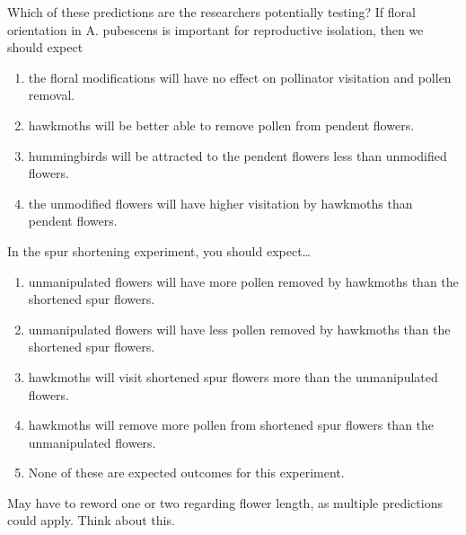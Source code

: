 \documentclass[t,hidelinks]{beamer}
\newcommand{\ques}[1]{\highlight{\textsc{q#1:}}}
\begin{document}
%
\begin{frame}[t]{\ques9 Which of these predictions are the researchers potentially testing?}
	If floral orientation in A. pubescens is important for reproductive isolation, then we should expect
	
	\begin{enumerate}
		\item the floral modifications will have no effect on pollinator visitation and pollen removal.
		\item hawkmoths will be better able to remove pollen from pendent flowers.
		\item hummingbirds will be attracted to the pendent flowers less than unmodified flowers.
		\item the unmodified flowers will have higher visitation by hawkmoths than pendent flowers.
	\end{enumerate}
\end{frame}
%
\begin{frame}[t]{\ques{10} In the spur shortening experiment, you should expect\dots}
	\begin{enumerate}
		\item unmanipulated flowers will have more pollen removed by hawkmoths than the shortened spur flowers.
		\item unmanipulated  flowers will have less pollen removed by hawkmoths than the shortened spur flowers.
		\item hawkmoths will visit shortened spur flowers more than the unmanipulated flowers.
		\item hawkmoths will remove more pollen from shortened spur flowers than the unmanipulated flowers.
		\item None of these are expected outcomes for this experiment.
	\end{enumerate}

	\hangpara May have to reword one or two regarding flower length, as multiple predictions could apply. Think about this.
\end{frame}
%
\end{document}
